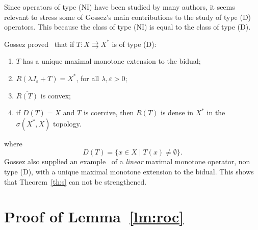 \documentclass[11pt]{article}
\newcommand{\tos}{\rightrightarrows} %
\begin{document}
Since operators of type (NI) have been studied by many authors, it
seems relevant to stress some of Gossez's main contributions to the
study of type (D) operators.  This because the class of type (NI) is
equal to the class of type (D).


Gossez proved~\cite{gos-ope.jmaa71,gos-ran.pams72} that if $T:X\tos
X^*$ is of type (D):
\begin{enumerate}
\item $T$ has a unique maximal monotone extension to the bidual;
\item $R(\lambda J_\varepsilon+T)=X^*$, for all $\lambda,\varepsilon>0$;
\item $\overline{ R(T)}$ is convex;
\item if $D(T)=X$ and $T$ is coercive, then $R(T)$ is dense in
  $X^{*}$ in the $\sigma(X^*,X)$ topology.
\end{enumerate}
where 
\[ D(T)=\{x\in X\;|\; T(x)\neq\emptyset\}.
\]
Gossez also supplied an example~\cite{gos-ran.pams72} of a
\emph{linear} maximal monotone operator, non type (D), with a unique
maximal monotone extension to the bidual. This shows that
Theorem~\ref{th:s} can not be strengthened.




\appendix

\section{Proof of Lemma~\ref{lm:roc}}\label{ap:1}
\end{document}
